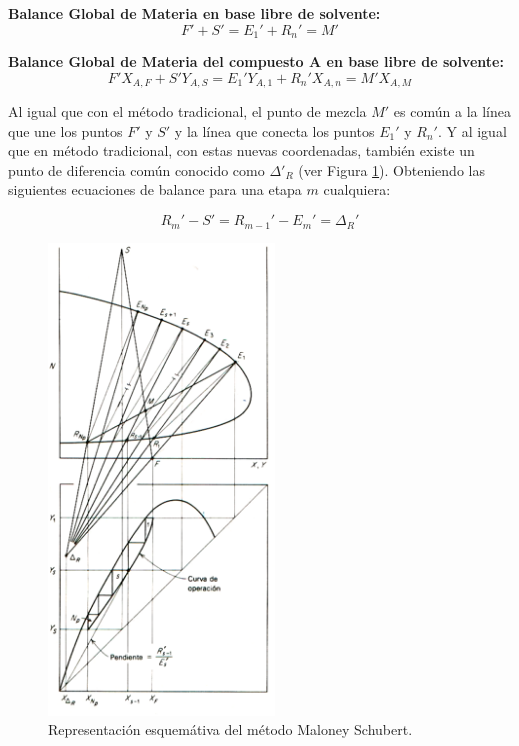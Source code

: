 \documentclass[11pt]{book}
\begin{document}
\textbf{Balance Global de Materia en base libre de solvente:}
\begin{equation}
    \label{eq:ExtraccionLiqLiqMaloney_5}
    F' + S' = E_1' + R_{n}' = M'
\end{equation}

\textbf{Balance Global de Materia del compuesto A en base libre de solvente:}
\begin{equation}
    \label{eq:ExtraccionLiqLiqMaloney_6}
    F' X_{A,F} + S' Y_{A,S} = E_1' Y_{A,1} + R_{n}' X_{A,n} = M' X_{A,M}
\end{equation}

Al igual que con el método tradicional, el punto de mezcla $M'$ es común a la línea que une los puntos $F'$ y $S'$ y la línea que conecta los puntos $E_1'$ y $R_n'$. Y al igual que en método tradicional, con estas nuevas coordenadas, también existe un punto de diferencia común conocido como $\Delta'_R$ (ver Figura \ref{fig:ExtraccionLiqLiqMaloneySchubert_2}). Obteniendo las siguientes ecuaciones de balance para una etapa $m$ cualquiera:

\begin{equation}
    \label{eq:ExtraccionLiqLiqMaloney_7}
    R_{m}' - S' = R_{m-1}' - E_{m}' = \Delta_R'
\end{equation}

\begin{figure}[H]
    \centering
    \includegraphics[width = 6cm ]{img/LiquidoLiquido/ExtraccionLiqLiqMetodoMaloneySchubert_2.PNG}
    \caption{Representación esquemátiva del método Maloney Schubert.}
    \label{fig:ExtraccionLiqLiqMaloneySchubert_2}
\end{figure}
\end{document}
